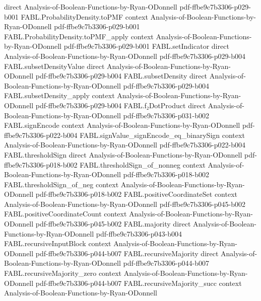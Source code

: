 \begin{theorem}
  {direct}
  {Analysis-of-Boolean-Functions-by-Ryan-ODonnell}
  {pdf-ffbe9c7b3306-p029-b001}
\proofstep
  {FABL.ProbabilityDensity.toPMF}
  {context}
  {Analysis-of-Boolean-Functions-by-Ryan-ODonnell}
  {pdf-ffbe9c7b3306-p029-b001}
\proofstep
  {FABL.ProbabilityDensity.toPMF_apply}
  {context}
  {Analysis-of-Boolean-Functions-by-Ryan-ODonnell}
  {pdf-ffbe9c7b3306-p029-b001}
\proofstep
  {FABL.setIndicator}
  {direct}
  {Analysis-of-Boolean-Functions-by-Ryan-ODonnell}
  {pdf-ffbe9c7b3306-p029-b004}
\proofstep
  {FABL.subsetDensityValue}
  {direct}
  {Analysis-of-Boolean-Functions-by-Ryan-ODonnell}
  {pdf-ffbe9c7b3306-p029-b004}
\proofstep
  {FABL.subsetDensity}
  {direct}
  {Analysis-of-Boolean-Functions-by-Ryan-ODonnell}
  {pdf-ffbe9c7b3306-p029-b004}
\proofstep
  {FABL.subsetDensity_apply}
  {context}
  {Analysis-of-Boolean-Functions-by-Ryan-ODonnell}
  {pdf-ffbe9c7b3306-p029-b004}
\proofstep
  {FABL.f₂DotProduct}
  {direct}
  {Analysis-of-Boolean-Functions-by-Ryan-ODonnell}
  {pdf-ffbe9c7b3306-p031-b002}
\proofstep
  {FABL.signEncode}
  {context}
  {Analysis-of-Boolean-Functions-by-Ryan-ODonnell}
  {pdf-ffbe9c7b3306-p022-b004}
\proofstep
  {FABL.signValue_signEncode_eq_binarySign}
  {context}
  {Analysis-of-Boolean-Functions-by-Ryan-ODonnell}
  {pdf-ffbe9c7b3306-p022-b004}
\proofstep
  {FABL.thresholdSign}
  {direct}
  {Analysis-of-Boolean-Functions-by-Ryan-ODonnell}
  {pdf-ffbe9c7b3306-p018-b002}
\proofstep
  {FABL.thresholdSign_of_nonneg}
  {context}
  {Analysis-of-Boolean-Functions-by-Ryan-ODonnell}
  {pdf-ffbe9c7b3306-p018-b002}
\proofstep
  {FABL.thresholdSign_of_neg}
  {context}
  {Analysis-of-Boolean-Functions-by-Ryan-ODonnell}
  {pdf-ffbe9c7b3306-p018-b002}
\proofstep
  {FABL.positiveCoordinateSet}
  {context}
  {Analysis-of-Boolean-Functions-by-Ryan-ODonnell}
  {pdf-ffbe9c7b3306-p045-b002}
\proofstep
  {FABL.positiveCoordinateCount}
  {context}
  {Analysis-of-Boolean-Functions-by-Ryan-ODonnell}
  {pdf-ffbe9c7b3306-p045-b002}
\proofstep
  {FABL.majority}
  {direct}
  {Analysis-of-Boolean-Functions-by-Ryan-ODonnell}
  {pdf-ffbe9c7b3306-p043-b004}
\proofstep
  {FABL.recursiveInputBlock}
  {context}
  {Analysis-of-Boolean-Functions-by-Ryan-ODonnell}
  {pdf-ffbe9c7b3306-p044-b007}
\proofstep
  {FABL.recursiveMajority}
  {direct}
  {Analysis-of-Boolean-Functions-by-Ryan-ODonnell}
  {pdf-ffbe9c7b3306-p044-b007}
\proofstep
  {FABL.recursiveMajority_zero}
  {context}
  {Analysis-of-Boolean-Functions-by-Ryan-ODonnell}
  {pdf-ffbe9c7b3306-p044-b007}
\proofstep
  {FABL.recursiveMajority_succ}
  {context}
  {Analysis-of-Boolean-Functions-by-Ryan-ODonnell}

\end{theorem}
